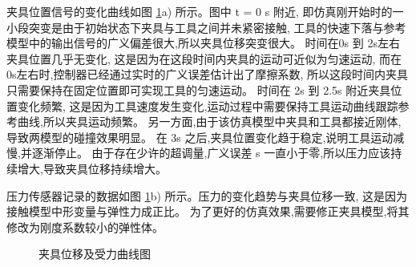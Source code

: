 夹具位置信号的变化曲线如图 \ref{fig:4-8}a) 所示。图中 t = 0 s 附近,
即仿真刚开始时的一小段突变是由于初始状态下夹具与工具之间并未紧密接触,
工具的快速下落与参考模型中的输出信号的广义偏差很大,所以夹具位移突变很大。
时间在0s 到 2s左右夹具位置几乎无变化, 这是因为在这段时间内夹具的运动可近似为匀速运动,
而在0s左右时,控制器已经通过实时的广义误差估计出了摩擦系数,
所以这段时间内夹具只需要保持在固定位置即可实现工具的匀速运动。
时间在 2s 到 2.5s 附近夹具位置变化频繁,
这是因为工具速度发生变化,运动过程中需要保持工具运动曲线跟踪参考曲线,所以夹具运动频繁。
另一方面,由于该仿真模型中夹具和工具都接近刚体,导致两模型的碰撞效果明显。
在 3s 之后,夹具位置变化趋于稳定,说明工具运动减慢,并逐渐停止。
由于存在少许的超调量,广义误差 s 一直小于零,所以压力应该持续增大,导致夹具位移持续增大。


压力传感器记录的数据如图 \ref{fig:4-8}b) 所示。压力的变化趋势与夹具位移一致,
这是因为接触模型中形变量与弹性力成正比。
为了更好的仿真效果,需要修正夹具模型,将其修改为刚度系数较小的弹性体。


\begin{figure}[!h]
  \centering
    \hspace{0pt}
  \caption{夹具位移及受力曲线图}
  \label{fig:4-8}
  \vspace{-0.3cm}
\end{figure}

